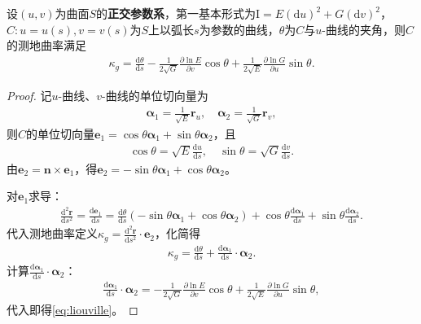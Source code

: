 \documentclass[../../main.tex]{subfiles}%
\begin{document}
\begin{theorem}
设$(u,v)$为曲面$S$的\textbf{正交参数系}，第一基本形式为$\mathrm{I}=E(\mathrm{d}u)^2+G(\mathrm{d}v)^2$，$C:u=u(s),v=v(s)$为$S$上以弧长$s$为参数的曲线，$\theta$为$C$与$u$-曲线的夹角，则$C$的测地曲率满足
\begin{align}
\kappa_g=\frac{\mathrm{d}\theta}{\mathrm{d}s}-\frac{1}{2\sqrt{G}}\frac{\partial\ln E}{\partial v}\cos\theta+\frac{1}{2\sqrt{E}}\frac{\partial\ln G}{\partial u}\sin\theta.\label{eq:liouville}
\end{align}
\end{theorem}
\begin{proof}

记$u$-曲线、$v$-曲线的单位切向量为
\begin{align*}
\boldsymbol{\alpha}_1=\frac{1}{\sqrt{E}}\boldsymbol{r}_u,\quad \boldsymbol{\alpha}_2=\frac{1}{\sqrt{G}}\boldsymbol{r}_v,
\end{align*}
则$C$的单位切向量$\boldsymbol{e}_1=\cos\theta\boldsymbol{\alpha}_1+\sin\theta\boldsymbol{\alpha}_2$，且
\begin{align*}
\cos\theta=\sqrt{E}\frac{\mathrm{d}u}{\mathrm{d}s},\quad \sin\theta=\sqrt{G}\frac{\mathrm{d}v}{\mathrm{d}s}.
\end{align*}
由$\boldsymbol{e}_2=\boldsymbol{n}\times\boldsymbol{e}_1$，得$\boldsymbol{e}_2=-\sin\theta\boldsymbol{\alpha}_1+\cos\theta\boldsymbol{\alpha}_2$。

对$\boldsymbol{e}_1$求导：
\begin{align*}
\frac{\mathrm{d}^2\boldsymbol{r}}{\mathrm{d}s^2}=\frac{\mathrm{d}\boldsymbol{e}_1}{\mathrm{d}s}=\frac{\mathrm{d}\theta}{\mathrm{d}s}(-\sin\theta\boldsymbol{\alpha}_1+\cos\theta\boldsymbol{\alpha}_2)+\cos\theta\frac{\mathrm{d}\boldsymbol{\alpha}_1}{\mathrm{d}s}+\sin\theta\frac{\mathrm{d}\boldsymbol{\alpha}_2}{\mathrm{d}s}.
\end{align*}
代入测地曲率定义$\kappa_g=\frac{\mathrm{d}^2\boldsymbol{r}}{\mathrm{d}s^2}\cdot\boldsymbol{e}_2$，化简得
\begin{align*}
\kappa_g=\frac{\mathrm{d}\theta}{\mathrm{d}s}+\frac{\mathrm{d}\boldsymbol{\alpha}_1}{\mathrm{d}s}\cdot\boldsymbol{\alpha}_2.
\end{align*}
计算$\frac{\mathrm{d}\boldsymbol{\alpha}_1}{\mathrm{d}s}\cdot\boldsymbol{\alpha}_2$：
\begin{align*}
\frac{\mathrm{d}\boldsymbol{\alpha}_1}{\mathrm{d}s}\cdot\boldsymbol{\alpha}_2=-\frac{1}{2\sqrt{G}}\frac{\partial\ln E}{\partial v}\cos\theta+\frac{1}{2\sqrt{E}}\frac{\partial\ln G}{\partial u}\sin\theta,
\end{align*}
代入即得\eqref{eq:liouville}。

\end{proof}
\end{document}
